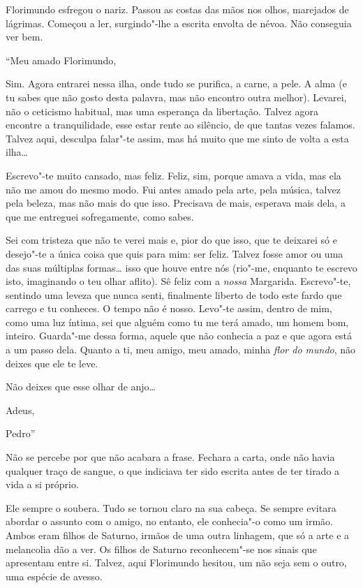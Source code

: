Florimundo esfregou o nariz. Passou as costas das mãos nos olhos,
marejados de lágrimas. Começou a ler, surgindo"-lhe a escrita envolta de
névoa. Não conseguia ver bem.

\medskip

``Meu amado Florimundo,

\smallskip

Sim. Agora entrarei nessa ilha, onde tudo se purifica, a carne, a pele.
A alma (e tu sabes que não gosto desta palavra, mas não encontro outra
melhor). Levarei, não o ceticismo habitual, mas uma esperança da
libertação. Talvez agora encontre a tranquilidade, esse estar rente ao
silêncio, de que tantas vezes falamos. Talvez aqui, desculpa falar"-te
assim, mas há muito que me sinto de volta a esta ilha\ldots{}

Escrevo"-te muito cansado, mas feliz. Feliz, sim, porque amava a vida,
mas ela não me amou do mesmo modo. Fui antes amado pela arte, pela
música, talvez pela beleza, mas não mais do que isso. Precisava de mais,
esperava mais dela, a que me entreguei sofregamente, como sabes.

Sei com tristeza que não te verei mais e, pior do que isso, que te
deixarei só e desejo"-te a única coisa que quis para mim: ser feliz.
Talvez fosse amor ou uma das suas múltiplas formas\ldots{} isso que houve
entre nós (rio"-me, enquanto te escrevo isto, imaginando o teu olhar
aflito). Sê feliz com a \emph{nossa} Margarida. Escrevo"-te, sentindo uma
leveza que nunca senti, finalmente liberto de todo este fardo que
carrego e tu conheces. O tempo não é nosso. Levo"-te assim, dentro de
mim, como uma luz íntima, sei que alguém como tu me terá amado, um homem
bom, inteiro. Guarda"-me dessa forma, aquele que não conhecia a paz e que
agora está a um passo dela. Quanto a ti, meu amigo, meu amado, minha
\emph{flor do mundo}, não deixes que ele te leve.

Não deixes que esse olhar de anjo\ldots{}

\smallskip

Adeus,

\smallskip

Pedro''

\medskip

Não se percebe por que não acabara a frase. Fechara a carta, onde não
havia qualquer traço de sangue, o que indiciava ter sido escrita antes
de ter tirado a vida a si próprio.

Ele sempre o soubera. Tudo se tornou claro na sua cabeça. Se sempre
evitara abordar o assunto com o amigo, no entanto, ele conhecia"-o como
um irmão. Ambos eram filhos de Saturno, irmãos de uma outra linhagem,
que só a arte e a melancolia dão a ver. Os filhos de Saturno
reconhecem"-se nos sinais que apresentam entre si. Talvez, aqui
Florimundo hesitou, um não seja sem o outro, uma espécie de avesso.

